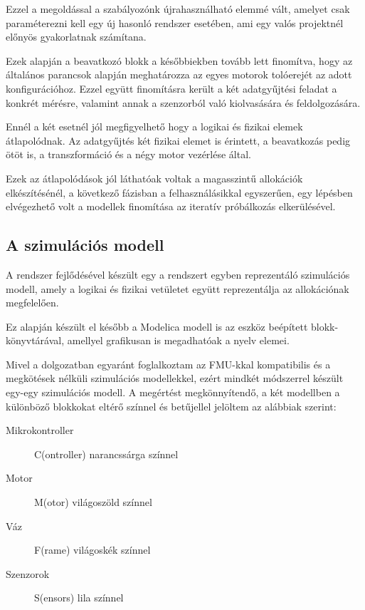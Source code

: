     Ezzel a megoldással a szabályozónk újrahasználható elemmé vált, amelyet csak paraméterezni kell egy új hasonló rendszer esetében, ami egy valós projektnél előnyös gyakorlatnak számítana.
    
    Ezek alapján a beavatkozó blokk a későbbiekben tovább lett finomítva, hogy az általános parancsok alapján meghatározza az egyes motorok tolóerejét az adott konfigurációhoz. 
    Ezzel együtt finomításra került a két adatgyűjtési feladat a konkrét mérésre, valamint annak a szenzorból való kiolvasására és feldolgozására.
    
    Ennél a két esetnél jól megfigyelhető hogy a logikai és fizikai elemek átlapolódnak. Az adatgyűjtés két fizikai elemet is érintett, a beavatkozás pedig ötöt is, a transzformáció és a négy motor vezérlése által.
    
    Ezek az átlapolódások jól láthatóak voltak a magasszintű allokációk elkészítésénél, a következő fázisban a felhasználásikkal egyszerűen, egy lépésben elvégezhető volt a modellek finomítása az iteratív próbálkozás elkerülésével.


    \subsection{A szimulációs modell}
    A rendszer fejlődésével készült egy a rendszert egyben reprezentáló szimulációs modell, amely a logikai és fizikai vetületet együtt reprezentálja az allokációnak megfelelően.
    
    Ez alapján készült el később a Modelica modell is az eszköz beépített blokk-könyvtárával, amellyel grafikusan is megadhatóak a nyelv elemei.
    
    Mivel a dolgozatban egyaránt foglalkoztam az FMU-kkal kompatibilis és a megkötések nélküli szimulációs modellekkel, ezért mindkét módszerrel készült egy-egy szimulációs modell.
    A megértést megkönnyítendő, a két modellben a különböző blokkokat eltérő színnel és betűjellel jelöltem az alábbiak szerint:

    \begin{description}
        \item[Mikrokontroller] C(ontroller) narancssárga színnel
        \item[Motor] M(otor) világoszöld színnel
        \item[Váz] F(rame) világoskék színnel
        \item[Szenzorok] S(ensors) lila színnel
    \end{description}

